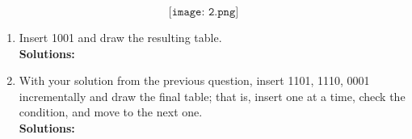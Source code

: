 \documentclass[paper=a4, fontsize=11pt]{scrartcl}
\numberwithin{equation}{section}        %
\numberwithin{figure}{section}          %
\numberwithin{table}{section}               %
\begin{document}
\[
\texttt{[image: 2.png]}
\]

\begin{enumerate}
    \item Insert 1001 and draw the resulting table.\\
    \textbf{Solutions: }

    \item With your solution from the previous question, insert 1101, 1110, 0001 incrementally and draw the final table; that is, insert one at a time, check the condition, and move to the next one.\\
    \textbf{Solutions: }


\end{enumerate}





\end{document}
